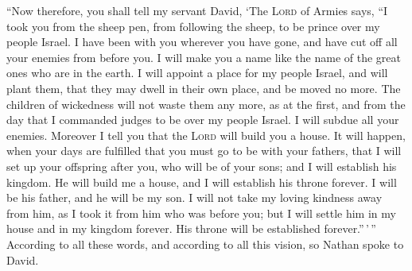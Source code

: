  ``Now therefore, you shall tell my servant David, `The
\textsc{Lord} of Armies says, ``I took you from the sheep pen, from
following the sheep, to be prince over my people Israel. 
I have been with you wherever you have gone, and have cut off all your
enemies from before you. I will make you a name like the name of the
great ones who are in the earth.  I will appoint a place
for my people Israel, and will plant them, that they may dwell in their
own place, and be moved no more. The children of wickedness will not
waste them any more, as at the first,  and from the day
that I commanded judges to be over my people Israel. I will subdue all
your enemies. Moreover I tell you that the \textsc{Lord} will build you
a house.  It will happen, when your days are fulfilled
that you must go to be with your fathers, that I will set up your
offspring after you, who will be of your sons; and I will establish his
kingdom.  He will build me a house, and I will establish
his throne forever.  I will be his father, and he will be
my son. I will not take my loving kindness away from him, as I took it
from him who was before you;  but I will settle him in my
house and in my kingdom forever. His throne will be established
forever.''\,'\,''  According to all these words, and
according to all this vision, so Nathan spoke to David.

